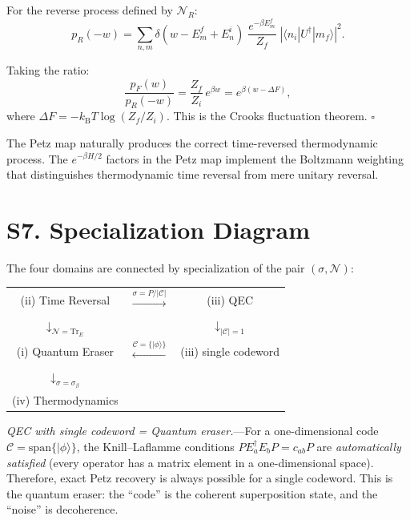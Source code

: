 \documentclass[prl,twocolumn,superscriptaddress,longbibliography]{revtex4-2}
\newcommand{\kB}{k_{\mathrm{B}}}
\newcommand{\Tr}{\mathrm{Tr}}
\newcommand{\chan}{\mathcal{N}}
\newcommand{\code}{\mathcal{C}}
\newcommand{\ket}[1]{|#1\rangle}
\newcommand{\bra}[1]{\langle#1|}
\newcommand{\abs}[1]{\left|#1\right|}
\begin{document}
For the reverse process defined by $\chan_R$:
\begin{equation}
p_R(-w) = \sum_{n,m} \delta(w - E_m^f + E_n^i)\;
\frac{e^{-\beta E_m^f}}{Z_f}\;\abs{\bra{n_i}U^\dagger\ket{m_f}}^2.
\end{equation}

Taking the ratio:
\begin{equation}
\frac{p_F(w)}{p_R(-w)} = \frac{Z_f}{Z_i}\, e^{\beta w}
= e^{\beta(w - \Delta F)},
\end{equation}
where $\Delta F = -\kB T \log(Z_f/Z_i)$. This is the Crooks
fluctuation theorem. \hfill$\square$

The Petz map naturally produces the correct time-reversed thermodynamic
process. The $e^{-\beta H/2}$ factors in the Petz map implement the
Boltzmann weighting that distinguishes thermodynamic time reversal from
mere unitary reversal.

\section{S7. Specialization Diagram}
\label{sec:diagram}

The four domains are connected by specialization of the pair
$(\sigma, \chan)$:

\begin{center}
\begin{tabular}{ccc}
(ii) Time Reversal & $\xrightarrow{\sigma = P/|\code|}$ & (iii) QEC \\
$\downarrow_{\chan = \Tr_E}$ & & $\downarrow_{|\code|=1}$ \\
(i) Quantum Eraser & $\xleftarrow{\code = \{\ket{\phi}\}}$ &
  (iii) single codeword \\
$\downarrow_{\sigma = \sigma_\beta}$ & & \\
(iv) Thermodynamics & &
\end{tabular}
\end{center}

\emph{QEC with single codeword = Quantum eraser.}---For a
one-dimensional code $\code = \mathrm{span}\{\ket{\phi}\}$, the
Knill--Laflamme conditions $P E_a^\dagger E_b P = c_{ab} P$ are
\emph{automatically satisfied} (every operator has a matrix element
in a one-dimensional space). Therefore, exact Petz recovery is always
possible for a single codeword. This is the quantum eraser: the ``code''
is the coherent superposition state, and the ``noise'' is decoherence.
\end{document}
